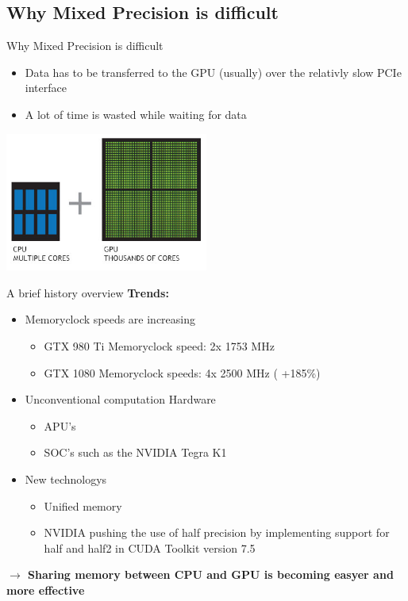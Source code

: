 \documentclass[10pt]{beamer}
\begin{document}
\subsection{Why Mixed Precision is difficult}
\begin{frame}{Why Mixed Precision is difficult}
\begin{itemize}
\item Data has to be transferred to the GPU (usually) over the relativly \color{red} slow PCIe \color{black} interface
\item A lot of time is wasted while waiting for data
\end{itemize}
\begin{center}
\includegraphics[width=0.5\textwidth]{../SourcesCites/cpu-and-gpu.jpg} 
\end{center}


\end{frame}

\begin{frame}{A brief history overview}
\textbf{Trends:}\\
\begin{itemize}
  \item Memoryclock speeds are increasing\\
  \begin{itemize}
    \item GTX 980 Ti Memoryclock speed: 2x 1753 MHz
    \item GTX 1080 Memoryclock speeds: 4x 2500 MHz (\color{red} +185\%\color{black})
  \end{itemize}
  \item Unconventional computation Hardware\\
  \begin{itemize}
    \item APU's
    \item SOC's such as the NVIDIA Tegra K1
  \end{itemize}
  \item New technologys\\
  \begin{itemize}
   \item Unified memory
   \item NVIDIA pushing the use of half precision by implementing support for half and half2 in CUDA Toolkit version 7.5 
  \end{itemize}
\end{itemize}
\textbf{$\rightarrow$ Sharing memory between CPU and GPU is becoming easyer and more effective}
\end{frame}
\end{document}
